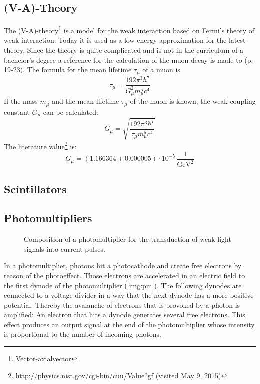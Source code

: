 \subsection{(V-A)-Theory}
The (V-A)-theory\footnote{Vector-axialvector} is a model for the weak interaction based on Fermi's theory of weak interaction. Today it is 
used as a low energy approximation for the latest theory. Since the theory is quite complicated and is not in the curriculum of a bachelor's 
degree a reference for the calculation of the muon decay is made to \cite{staatsex} (p. 19-23). The formula for the mean lifetime $\tau_\mu$ of a muon is
\begin{equation}
    \tau_\mu = \frac{192 \pi^3 \hbar^7}{G_\mu^2 m_\mu^5 c^4}
\end{equation}
If the mass $m_\mu$ and the mean lifetime $\tau_\mu$ of the muon is known, the weak coupling constant $G_\mu$ can be calculated:
\begin{equation}
    \label{eq:weakcouplingconstant}
    G_\mu = \sqrt{\frac{192 \pi^3 \hbar^7}{\tau_\mu m_\mu^5 c^4}}
\end{equation}
The literature value\footnote{\url{http://physics.nist.gov/cgi-bin/cuu/Value?gf} (visited May 9. 2015)} is:
\begin{equation}
    \label{eq:litval:weakcouplingconstant}
    G_\mu = \left( 1.166364 \pm 0.000005 \right) \cdot 10^{-5}\,\frac{1}{\text{GeV}^2}
\end{equation}


\subsection{Scintillators}


\subsection{Photomultipliers}

\begin{figure}[H]
        \centering
        \def\svgwidth{0.7\textwidth}
       
        \caption{Composition of a photomultiplier for the transduction of weak light signals into current pulses.}
        \label{img:pm}
\end{figure}

In a photomultiplier, photons hit a photocathode and create free electrons by reason of the photoeffect.
Those electrons are accelerated in an electric field to the first dynode of the photomultiplier (\autoref{img:pm}).
The following dynodes are connected to a voltage divider in a way that the next dynode has a more positive potential.
Thereby the avalanche of electrons that is provoked by a photon is amplified:
An electron that hits a dynode generates several free electrons.
This effect produces an output signal at the end of the photomultiplier whose intensity is proportional
to the number of incoming photons.
